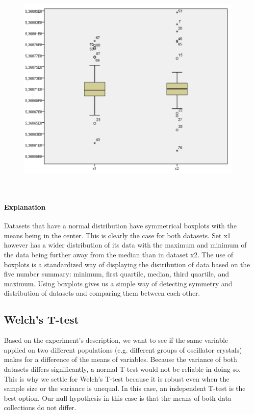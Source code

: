\documentclass[14]{article}
\begin{document}
\begin{figure}[!htb]
	\includegraphics[width=1.0\textwidth]{img/question1/Question1_Boxplot.PNG}
	\captionsetup{width=1.0\textwidth}
	\centering
\end{figure}
\mbox{}\\ 

\paragraph{Explanation}\mbox{}\newline
Datasets that have a normal distribution have symmetrical boxplots with the means being in the center. This is clearly the case for both datasets. Set x1 however has a wider distribution of its data with the maximum and minimum of the data being further away from the median than in dataset x2. 
\newline
The use of boxplots is a standardized way of displaying the distribution of data based on the five number summary: minimum, first quartile, median, third quartile, and maximum. Using boxplots gives us a simple way of detecting symmetry and distribution of datasets and comparing them between each other. 

\subsection{Welch's T-test}
Based on the experiment's description, we want to see if the same variable applied on two different populations (e.g. different groups of oscillator crystals) makes for a difference of the means of variables. Because the variance of both datasets differs significantly, a normal T-test would not be reliable in doing so. 
\newline
This is why we settle for Welch's T-test because it is robust even when the sample size or the variance is unequal. In this case, an independent T-test is the best option. Our null hypothesis in this case is that the means of both data collections do not differ. 
\end{document}
